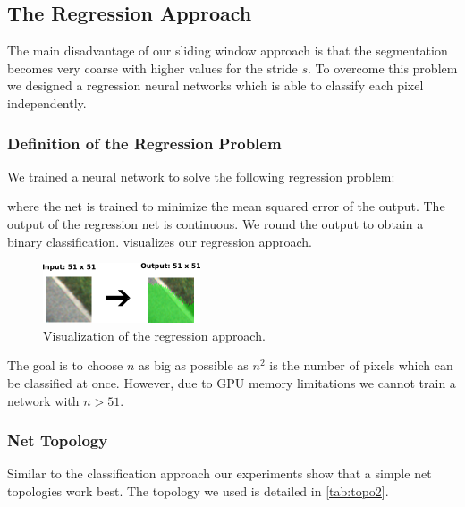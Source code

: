 \subsection{The Regression Approach}
The main disadvantage of our sliding window approach is that the segmentation
becomes very coarse with higher values for the stride $s$. To overcome this
problem we designed a regression neural networks which is able to classify each
pixel independently.

\subsubsection{Definition of the Regression Problem}
We trained a neural network to solve the following regression problem:


where the net is trained to minimize the mean squared error of the output. The
output of the regression net is continuous. We round the output to obtain a
binary classification.  visualizes our regression approach.

\begin{figure}[H]
	\centering
	\includegraphics[width=0.5\columnwidth]{figures/models/fully-conv.png}
	\caption{Visualization of the regression approach.}
	\label{fig:reg}
\end{figure}

The goal is to choose $n$ as big as possible as $n^2$ is the number of pixels
which can be classified at once. However, due to GPU memory limitations we
cannot train a network with $n > 51$.


\subsubsection{Net Topology}
Similar to the classification approach our experiments show that a simple net
topologies work best. The topology we used is detailed in \cref{tab:topo2}.

